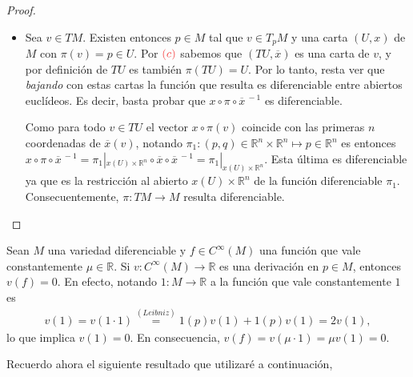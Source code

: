 \documentclass[11pt]{article}
\newcommand{\R}{\mathbb{R}}
\newcommand{\paint}[2]{\color{#1}{#2}}
\newcommand{\ol}{\overline}
\newenvironment{obs}[2][Observaci\'on]{\begin{trivlist}
\item[\hskip \labelsep \paint{red}{{\bfseries #1}}\hskip \labelsep {\bfseries #2.}]}{\end{trivlist}}
\begin{document}
\begin{proof}
\begin{itemize}
\item[(d)] Sea $v \in TM$. Existen entonces $p \in M$ tal que $v \in T_pM$ y una carta $(U,x)$ de $M$ con $\pi(v) = p \in U$. Por $\paint{red}{(c)}$ sabemos que $(TU, \ol{x})$ es una carta de $v$, y por definici\'on de $TU$ es tambi\'en $\pi(TU) = U$. Por lo tanto, resta ver que \textit{bajando} con estas cartas la funci\'on que resulta es diferenciable entre abiertos eucl\'ideos. Es decir, basta probar que $x\circ \pi \circ \ol{x}^{\ -1}$ es diferenciable.
\begin{center}
\end{center}
Como para todo $v \in TU$ el vector $x \circ \pi(v)$ coincide con las primeras $n$ coordenadas de $\ol{x}(v)$, notando $\pi_1 : (p,q) \in \R^n \times \R^n \mapsto p \in \R^n$ es entonces $x\circ \pi \circ \ol{x}^{\ -1} = \pi_1|_{x(U) \times \R^n} \circ \ol{x} \circ \ol{x}^{\ -1}  = \pi_1|_{x(U) \times \R^n}$. Esta \'ultima es diferenciable ya que es la restricci\'on al abierto $x(U) \times \R^n$ de la funci\'on diferenciable $\pi_1$. Consecuentemente, $\pi : TM \to M$ resulta diferenciable.
\end{itemize}
\end{proof}

\begin{obs}{1} Sean $M$ una variedad diferenciable y $f \in C^\infty(M)$ una funci\'on que vale constantemente $\mu \in \R$. Si $v : C^\infty(M) \to \R$ es una derivaci\'on en $p \in M$, entonces $v(f) = 0$. En efecto, notando $1 : M \to \R$ a la funci\'on que vale constantemente $1$ es
\begin{align*}
v(1) = v(1 \cdot 1) \stackrel{(Leibniz)}{=} 1(p)v(1) + 1(p)v(1) = 2v(1),
\end{align*}
lo que implica $v(1) = 0$. En consecuencia, $v(f) = v(\mu \cdot 1) = \mu v(1) = 0$.
\end{obs}

Recuerdo ahora el siguiente resultado que utilizar\'e a continuaci\'on,
\end{document}
